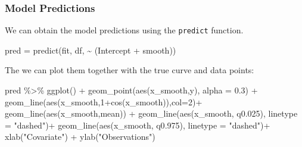 \documentclass[
  letterpaper,
  DIV=11,
  numbers=noendperiod]{scrartcl}
\newenvironment{Shaded}{\begin{snugshade}}{\end{snugshade}}
\newcommand{\AttributeTok}[1]{\textcolor[rgb]{0.40,0.45,0.13}{#1}}
\newcommand{\DecValTok}[1]{\textcolor[rgb]{0.68,0.00,0.00}{#1}}
\newcommand{\FloatTok}[1]{\textcolor[rgb]{0.68,0.00,0.00}{#1}}
\newcommand{\FunctionTok}[1]{\textcolor[rgb]{0.28,0.35,0.67}{#1}}
\newcommand{\NormalTok}[1]{\textcolor[rgb]{0.00,0.23,0.31}{#1}}
\newcommand{\OtherTok}[1]{\textcolor[rgb]{0.00,0.23,0.31}{#1}}
\newcommand{\SpecialCharTok}[1]{\textcolor[rgb]{0.37,0.37,0.37}{#1}}
\newcommand{\StringTok}[1]{\textcolor[rgb]{0.13,0.47,0.30}{#1}}
\begin{document}
\subsubsection{Model Predictions}\label{model-predictions-1}

We can obtain the model predictions using the \texttt{predict} function.

\begin{Shaded}
\begin{Highlighting}[]
\NormalTok{pred }\OtherTok{=} \FunctionTok{predict}\NormalTok{(fit, df, }\SpecialCharTok{\textasciitilde{}}\NormalTok{ (Intercept }\SpecialCharTok{+}\NormalTok{ smooth))}
\end{Highlighting}
\end{Shaded}

The we can plot them together with the true curve and data points:

\begin{Shaded}
\begin{Highlighting}[]
\NormalTok{pred }\SpecialCharTok{\%\textgreater{}\%} \FunctionTok{ggplot}\NormalTok{() }\SpecialCharTok{+} 
  \FunctionTok{geom\_point}\NormalTok{(}\FunctionTok{aes}\NormalTok{(x\_smooth,y), }\AttributeTok{alpha =} \FloatTok{0.3}\NormalTok{) }\SpecialCharTok{+}
  \FunctionTok{geom\_line}\NormalTok{(}\FunctionTok{aes}\NormalTok{(x\_smooth,}\DecValTok{1}\SpecialCharTok{+}\FunctionTok{cos}\NormalTok{(x\_smooth)),}\AttributeTok{col=}\DecValTok{2}\NormalTok{)}\SpecialCharTok{+}
  \FunctionTok{geom\_line}\NormalTok{(}\FunctionTok{aes}\NormalTok{(x\_smooth,mean)) }\SpecialCharTok{+}
  \FunctionTok{geom\_line}\NormalTok{(}\FunctionTok{aes}\NormalTok{(x\_smooth, q0}\FloatTok{.025}\NormalTok{), }\AttributeTok{linetype =} \StringTok{"dashed"}\NormalTok{)}\SpecialCharTok{+}
  \FunctionTok{geom\_line}\NormalTok{(}\FunctionTok{aes}\NormalTok{(x\_smooth, q0}\FloatTok{.975}\NormalTok{), }\AttributeTok{linetype =} \StringTok{"dashed"}\NormalTok{)}\SpecialCharTok{+}
  \FunctionTok{xlab}\NormalTok{(}\StringTok{"Covariate"}\NormalTok{) }\SpecialCharTok{+} \FunctionTok{ylab}\NormalTok{(}\StringTok{"Observations"}\NormalTok{)}
\end{Highlighting}
\end{Shaded}
\end{document}
